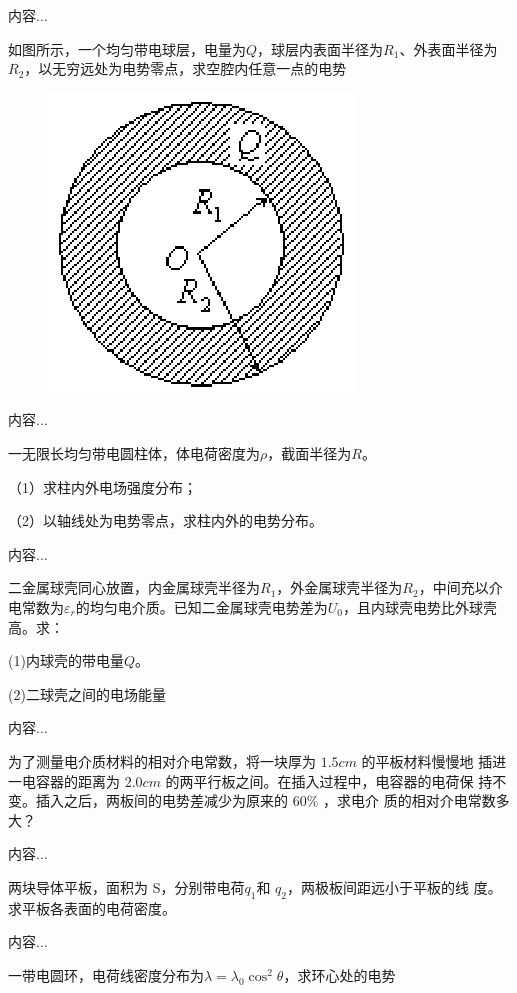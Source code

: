 \documentclass[lang=cn,10pt]{elegantbook}
\begin{document}
		\begin{solution}
			内容...
		\end{solution}
		\begin{exercise}
			如图所示，一个均匀带电球层，电量为$Q$，球层内表面半径为$R_{1}$、外表面半径为$R_{2}$，以无穷远处为电势零点，求空腔内任意一点的电势
\begin{figure}[H]
	\centering
	\includegraphics[width=0.15\linewidth]{image/图片10}
	\caption{}
	\label{fig:10}
\end{figure}
		\end{exercise}
		\begin{solution}
			内容...
		\end{solution}
		\begin{exercise}
			一无限长均匀带电圆柱体，体电荷密度为$\rho$，截面半径为$R$。
			
			（1）求柱内外电场强度分布；
			
			（2）以轴线处为电势零点，求柱内外的电势分布。
		\end{exercise}
		\begin{solution}
			内容...
		\end{solution}
		\begin{exercise}
			二金属球壳同心放置，内金属球壳半径为$R_{1}$，外金属球壳半径为$R_{2}$，中间充以介电常数为$\varepsilon_{r}$的均匀电介质。已知二金属球壳电势差为$U_{0}$，且内球壳电势比外球壳高。求：
			
			(1)内球壳的带电量$Q$。
			
			(2)二球壳之间的电场能量
		\end{exercise}
		\begin{solution}
			内容...
		\end{solution}
		\begin{exercise}
			为了测量电介质材料的相对介电常数，将一块厚为 $1.5cm$ 的平板材料慢慢地
			插进一电容器的距离为 $2.0cm$ 的两平行板之间。在插入过程中，电容器的电荷保
			持不变。插入之后，两板间的电势差减少为原来的 $60\%$ ，求电介
			质的相对介电常数多大？
		\end{exercise}
		\begin{solution}
			内容...
		\end{solution}
		\begin{exercise}
			两块导体平板，面积为 S，分别带电荷$q_{1}$和 $q_{2}$，两极板间距远小于平板的线
			度。求平板各表面的电荷密度。
		\end{exercise}
		\begin{solution}
			内容...
		\end{solution}
		\begin{exercise}
			一带电圆环，电荷线密度分布为$\lambda =\lambda_{0}\cos^{2}\theta$，求环心处的电势

		\end{exercise}
\end{document}
